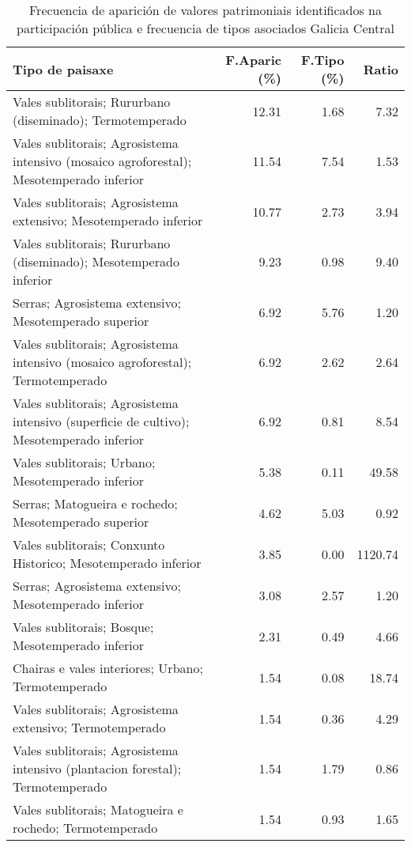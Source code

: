 \begin{table}[p]
\centering
\caption{Frecuencia de aparición de valores patrimoniais identificados na participación pública e frecuencia de tipos asociados Galicia Central} 
\label{vsixotpat7}
\begin{tabular}{lrrr}
  \hline
Tipo de paisaxe & F.Aparic (\%) & F.Tipo (\%) & Ratio \\ 
  \hline
Vales sublitorais; Rururbano (diseminado); Termotemperado & 12.31 & 1.68 & 7.32 \\ 
  Vales sublitorais; Agrosistema intensivo (mosaico agroforestal); Mesotemperado inferior & 11.54 & 7.54 & 1.53 \\ 
  Vales sublitorais; Agrosistema extensivo; Mesotemperado inferior & 10.77 & 2.73 & 3.94 \\ 
  Vales sublitorais; Rururbano (diseminado); Mesotemperado inferior & 9.23 & 0.98 & 9.40 \\ 
  Serras; Agrosistema extensivo; Mesotemperado superior & 6.92 & 5.76 & 1.20 \\ 
  Vales sublitorais; Agrosistema intensivo (mosaico agroforestal); Termotemperado & 6.92 & 2.62 & 2.64 \\ 
  Vales sublitorais; Agrosistema intensivo (superficie de cultivo); Mesotemperado inferior & 6.92 & 0.81 & 8.54 \\ 
  Vales sublitorais; Urbano; Mesotemperado inferior & 5.38 & 0.11 & 49.58 \\ 
  Serras; Matogueira e rochedo; Mesotemperado superior & 4.62 & 5.03 & 0.92 \\ 
  Vales sublitorais; Conxunto Historico; Mesotemperado inferior & 3.85 & 0.00 & 1120.74 \\ 
  Serras; Agrosistema extensivo; Mesotemperado inferior & 3.08 & 2.57 & 1.20 \\ 
  Vales sublitorais; Bosque; Mesotemperado inferior & 2.31 & 0.49 & 4.66 \\ 
  Chairas e vales interiores; Urbano; Termotemperado & 1.54 & 0.08 & 18.74 \\ 
  Vales sublitorais; Agrosistema extensivo; Termotemperado & 1.54 & 0.36 & 4.29 \\ 
  Vales sublitorais; Agrosistema intensivo (plantacion forestal); Termotemperado & 1.54 & 1.79 & 0.86 \\ 
  Vales sublitorais; Matogueira e rochedo; Termotemperado & 1.54 & 0.93 & 1.65 \\ 
   \hline
\end{tabular}
\end{table}
